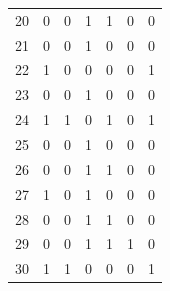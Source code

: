 \begin{table}
\begin{tabular}{|r|c|c|c|c|c|c|}
20 &         0 &         0 &         1 &         1 &         0 &         0 \\
21 &         0 &         0 &         1 &         0 &         0 &         0 \\
22 &         1 &         0 &         0 &         0 &         0 &         1 \\
23 &         0 &         0 &         1 &         0 &         0 &         0 \\
24 &         1 &         1 &         0 &         1 &         0 &         1 \\
25 &         0 &         0 &         1 &         0 &         0 &         0 \\
26 &         0 &         0 &         1 &         1 &         0 &         0 \\
27 &         1 &         0 &         1 &         0 &         0 &         0 \\
28 &         0 &         0 &         1 &         1 &         0 &         0 \\
29 &         0 &         0 &         1 &         1 &         1 &         0 \\
30 &         1 &         1 &         0 &         0 &         0 &         1 

\end{tabular}
\end{table}